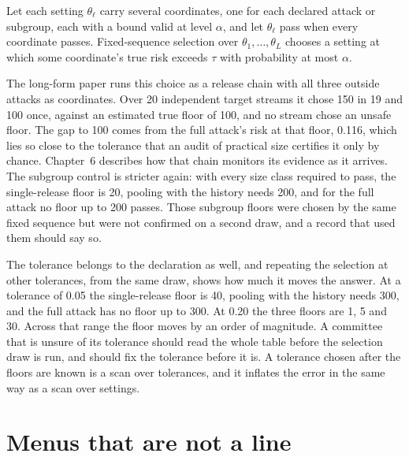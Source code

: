 \begin{corollary}\label{c05:cor-chain}
Let each setting $\theta_\ell$ carry several coordinates, one for each declared attack or
subgroup, each with a bound valid at level $\alpha$, and let $\theta_\ell$ pass when every
coordinate passes. Fixed-sequence selection over $\theta_1, \dots, \theta_L$ chooses a
setting at which some coordinate's true risk exceeds $\tau$ with probability at most
$\alpha$.
\end{corollary}

The long-form paper runs this choice as a release chain with all three outside attacks as
coordinates. Over 20 independent target streams it chose 150 in 19 and 100 once, against
an estimated true floor of 100, and no stream chose an unsafe floor.
The gap to 100 comes from the full attack's risk at that floor, 0.116, which lies so
close to the tolerance that an audit of practical size certifies it only by chance.
Chapter~6 describes how that chain monitors its evidence as it arrives. The subgroup
control is stricter again: with every size class required to pass, the single-release
floor is 20, pooling with the history needs 200, and for the full attack no floor up to
200 passes.
Those subgroup floors were chosen by the same fixed sequence but were not confirmed on a
second draw, and a record that used them should say so.

The tolerance belongs to the declaration as well, and repeating the selection at other
tolerances, from the same draw, shows how much it moves the answer. At a tolerance of 0.05 the
single-release floor is 40, pooling with the history needs 300, and the full attack has
no floor up to 300. At 0.20 the three floors are 1, 5 and 30.
Across that range the floor moves by an order of magnitude. A committee that is unsure
of its tolerance should read the whole table before the selection draw is run, and
should fix the tolerance before it is. A tolerance chosen after the floors are known is a
scan over tolerances, and it inflates the error in the same way as a scan over settings.

\section{Menus that are not a line}

